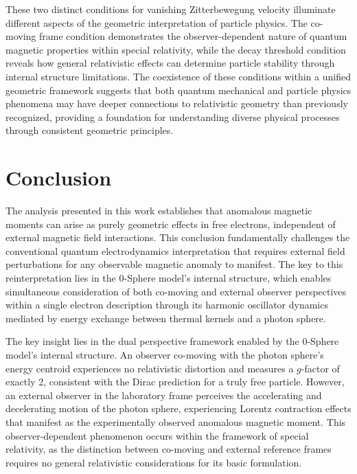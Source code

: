 \documentclass[%
 reprint,
 amsmath,amssymb,
 aps,
]{revtex4-1}
\numberwithin{equation}{section}%
\begin{document}
These two distinct conditions for vanishing Zitterbewegung velocity illuminate different aspects of the geometric interpretation of particle physics. The co-moving frame condition demonstrates the observer-dependent nature of quantum magnetic properties within special relativity, while the decay threshold condition reveals how general relativistic effects can determine particle stability through internal structure limitations. The coexistence of these conditions within a unified geometric framework suggests that both quantum mechanical and particle physics phenomena may have deeper connections to relativistic geometry than previously recognized, providing a foundation for understanding diverse physical processes through consistent geometric principles.


\section{Conclusion}

The analysis presented in this work establishes that anomalous magnetic moments can arise as purely geometric effects in free electrons, independent of external magnetic field interactions. This conclusion fundamentally challenges the conventional quantum electrodynamics interpretation that requires external field perturbations for any observable magnetic anomaly to manifest. The key to this reinterpretation lies in the 0-Sphere model's internal structure, which enables simultaneous consideration of both co-moving and external observer perspectives within a single electron description through its harmonic oscillator dynamics mediated by energy exchange between thermal kernels and a photon sphere.

The key insight lies in the dual perspective framework enabled by the 0-Sphere model's internal structure. An observer co-moving with the photon sphere's energy centroid experiences no relativistic distortion and measures a $g$-factor of exactly 2, consistent with the Dirac prediction for a truly free particle. However, an external observer in the laboratory frame perceives the accelerating and decelerating motion of the photon sphere, experiencing Lorentz contraction effects that manifest as the experimentally observed anomalous magnetic moment. This observer-dependent phenomenon occurs within the framework of special relativity, as the distinction between co-moving and external reference frames requires no general relativistic considerations for its basic formulation.
\end{document}
